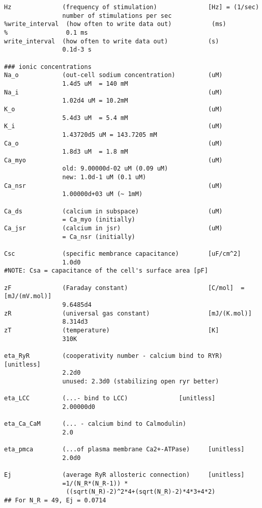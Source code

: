 \begin{verbatim}
Hz              (frequency of stimulation)              [Hz] = (1/sec)
                number of stimulations per sec
%write_interval  (how often to write data out)           (ms)
%                0.1 ms
write_interval  (how often to write data out)           (s)
                0.1d-3 s

### ionic concentrations
Na_o            (out-cell sodium concentration)         (uM)
                1.4d5 uM  = 140 mM
Na_i                                                    (uM)
                1.02d4 uM = 10.2mM
K_o                                                     (uM)
                5.4d3 uM  = 5.4 mM
K_i                                                     (uM)
                1.43720d5 uM = 143.7205 mM
Ca_o                                                    (uM)
                1.8d3 uM  = 1.8 mM
Ca_myo                                                  (uM)
                old: 9.00000d-02 uM (0.09 uM)
                new: 1.0d-1 uM (0.1 uM)
Ca_nsr                                                  (uM)
                1.00000d+03 uM (~ 1mM)

Ca_ds           (calcium in subspace)                   (uM)
                = Ca_myo (initially)
Ca_jsr          (calcium in jsr)                        (uM)
                = Ca_nsr (initially)

Csc             (specific membrance capacitance)        [uF/cm^2]
                1.0d0
#NOTE: Csa = capacitance of the cell's surface area [pF]

zF              (Faraday constant)                      [C/mol]  = [mJ/(mV.mol)]
                9.6485d4
zR              (universal gas constant)                [mJ/(K.mol)]
                8.314d3
zT              (temperature)                           [K]
                310K

eta_RyR         (cooperativity number - calcium bind to RYR) [unitless]
                2.2d0
                unused: 2.3d0 (stabilizing open ryr better)
                
eta_LCC         (...- bind to LCC)              [unitless] 
                2.00000d0
                
eta_Ca_CaM      (... - calcium bind to Calmodulin)
				2.0
				                
eta_pmca        (...of plasma membrane Ca2+-ATPase)     [unitless]
                2.0d0

Ej              (average RyR allosteric connection)     [unitless]
                =1/(N_R*(N_R-1)) *
                 ((sqrt(N_R)-2)^2*4+(sqrt(N_R)-2)*4*3+4*2)
## For N_R = 49, Ej = 0.0714


\end{verbatim}
